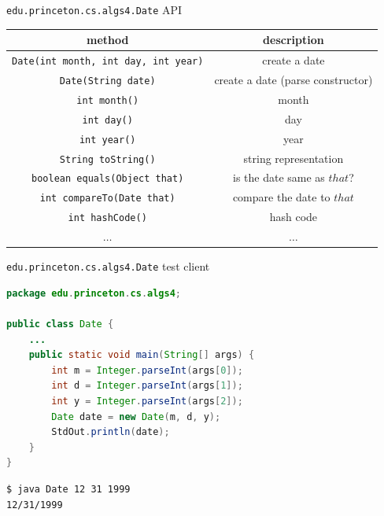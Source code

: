 \documentclass[8pt,a4paper,compress]{beamer}
\begin{document}
\begin{frame}[fragile]
\lstinline{edu.princeton.cs.algs4.Date} API
\begin{center}
\begin{tabular}{cc}
method & description \\ \hline
\lstinline$Date(int month, int day, int year)$ & create a date \\
\lstinline$Date(String date)$ & create a date (parse constructor) \\
\lstinline$int month()$ &  month \\
\lstinline$int day()$ & day \\
\lstinline$int year()$ & year \\
\lstinline$String toString()$ & string representation \\
\lstinline$boolean equals(Object that)$ & is the date same as $that$? \\
\lstinline$int compareTo(Date that)$ & compare the date to $that$ \\
\lstinline$int hashCode()$ & hash code \\
$\dots$ & $\dots$
\end{tabular} 
\end{center}

\lstinline{edu.princeton.cs.algs4.Date} test client
\begin{lstlisting}[language=Java]
package edu.princeton.cs.algs4;

public class Date {
    ...
    public static void main(String[] args) {
        int m = Integer.parseInt(args[0]);
        int d = Integer.parseInt(args[1]);
        int y = Integer.parseInt(args[2]);
        Date date = new Date(m, d, y);
        StdOut.println(date);
    }
}
\end{lstlisting}

\begin{lstlisting}[language={}]
$ java Date 12 31 1999
12/31/1999
\end{lstlisting}
\end{frame}
\end{document}
